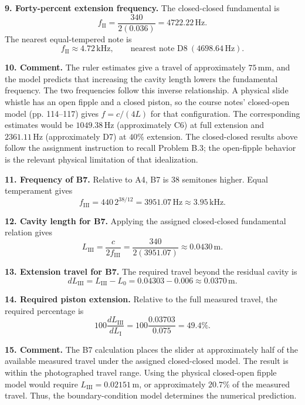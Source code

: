 \textbf{9. Forty-percent extension frequency.} The closed-closed fundamental is
\[
f_{\mathrm{II}}=\frac{340}{2(0.036)}=4722.22\,\mathrm{Hz}.
\]
The nearest equal-tempered note is
\[
\boxed{f_{\mathrm{II}}\approx4.72\,\mathrm{kHz},\qquad \text{nearest note }\mathrm{D8}\ (4698.64\,\mathrm{Hz}).}
\]

\textbf{10. Comment.} The ruler estimates give a travel of approximately $75\,\mathrm{mm}$, and the model predicts that increasing the cavity length lowers the fundamental frequency. The two frequencies follow this inverse relationship. A physical slide whistle has an open fipple and a closed piston, so the course notes' closed-open model (pp. 114--117) gives $f=c/(4L)$ for that configuration. The corresponding estimates would be $1049.38\,\mathrm{Hz}$ (approximately C6) at full extension and $2361.11\,\mathrm{Hz}$ (approximately D7) at $40\%$ extension. The closed-closed results above follow the assignment instruction to recall Problem B.3; the open-fipple behavior is the relevant physical limitation of that idealization.

\textbf{11. Frequency of B7.} Relative to A4, B7 is 38 semitones higher. Equal temperament gives
\[
\boxed{f_{\mathrm{III}}=440\,2^{38/12}=3951.07\,\mathrm{Hz}\approx3.95\,\mathrm{kHz}.}
\]

\textbf{12. Cavity length for B7.} Applying the assigned closed-closed fundamental relation gives
\[
\boxed{L_{\mathrm{III}}=\frac{c}{2f_{\mathrm{III}}}
=\frac{340}{2(3951.07)}\approx0.0430\,\mathrm{m}.}
\]

\textbf{13. Extension travel for B7.} The required travel beyond the residual cavity is
\[
\boxed{dL_{\mathrm{III}}=L_{\mathrm{III}}-L_{0}=0.04303-0.006\approx0.0370\,\mathrm{m}.}
\]

\textbf{14. Required piston extension.} Relative to the full measured travel, the required percentage is
\[
\boxed{100\frac{dL_{\mathrm{III}}}{dL_{\mathrm{I}}}
=100\frac{0.03703}{0.075}=49.4\%.}
\]

\textbf{15. Comment.} The B7 calculation places the slider at approximately half of the available measured travel under the assigned closed-closed model. The result is within the photographed travel range. Using the physical closed-open fipple model would require $L_{\mathrm{III}}=0.02151\,\mathrm{m}$, or approximately $20.7\%$ of the measured travel. Thus, the boundary-condition model determines the numerical prediction.

\clearpage
{}

